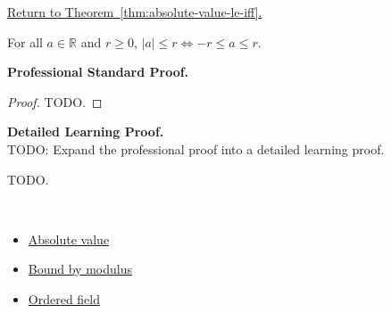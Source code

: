 \newpage
{}
\label{prf:absolute-value-le-iff}

\begin{remark*}[Return]
\hyperref[thm:absolute-value-le-iff]{Return to Theorem~\ref*{thm:absolute-value-le-iff}.}
\end{remark*}

\begin{theorem*}
For all $a \in \mathbb{R}$ and $r \ge 0$,
$\lvert a \rvert \le r \iff -r \le a \le r$.
\end{theorem*}

\textbf{Professional Standard Proof.}~\\
\begin{proof}
TODO.
\end{proof}

\textbf{Detailed Learning Proof.}~\\
TODO: Expand the professional proof into a detailed learning proof.


\begin{remark*}
TODO.
\end{remark*}

\begin{remark*}[Dependencies]~\\
\begin{itemize}
  \item \hyperref[def:absolute-value]{Absolute value}
  \item \hyperref[thm:absolute-value-bounds]{Bound by modulus}
  \item \hyperref[def:ordered-field]{Ordered field}
\end{itemize}
\end{remark*}
